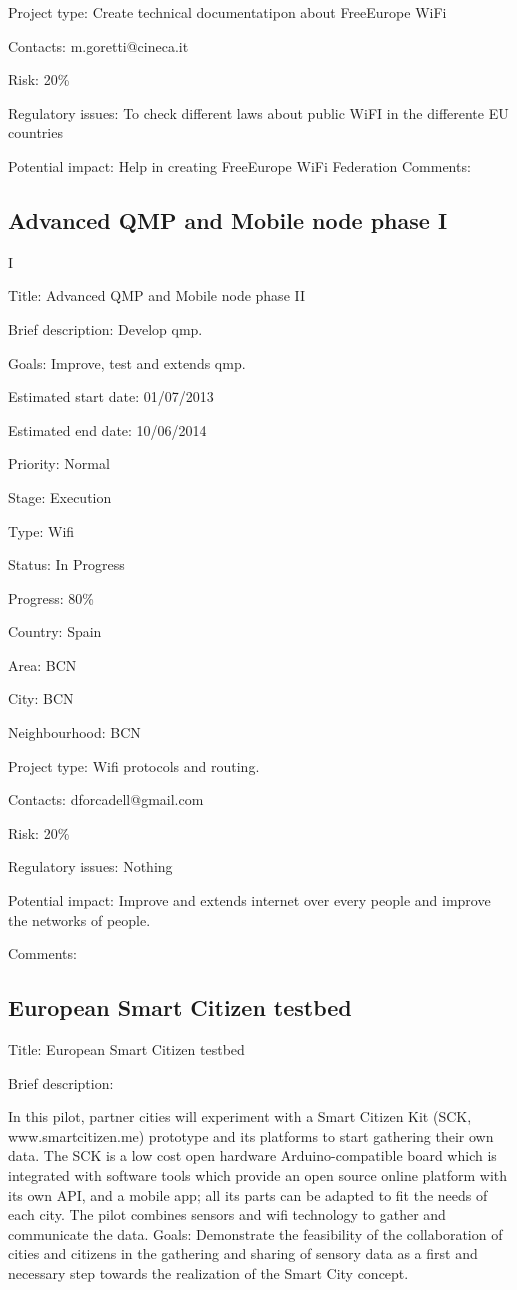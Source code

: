 \documentclass[draftclsnofoot,12pt,journal,onecolumn]{IEEEtran}
\begin{document}
Project type: Create technical documentatipon about FreeEurope WiFi 

Contacts: m.goretti@cineca.it

Risk: 20\% 

Regulatory issues: To check different laws about public WiFI in the 
differente EU countries 

Potential impact: Help in creating FreeEurope WiFi Federation 
Comments: 

\subsection{Advanced QMP and Mobile node phase I}I

Title: Advanced QMP and Mobile node phase II

Brief description: Develop qmp.

Goals: Improve, test and extends qmp.

Estimated start date: 01/07/2013

Estimated end date: 10/06/2014

Priority: Normal

Stage: Execution

Type: Wifi

Status: In Progress

Progress: 80\%

Country: Spain

Area: BCN

City: BCN

Neighbourhood: BCN

Project type: Wifi protocols and routing.

Contacts: dforcadell@gmail.com

Risk: 20\%

Regulatory issues: Nothing

Potential impact: Improve and extends internet over every people and improve
the networks of people.

Comments:

\subsection{European Smart Citizen testbed}

Title: European Smart Citizen testbed

Brief description:

In this pilot, partner cities will experiment with a Smart Citizen Kit (SCK,
www.smartcitizen.me) prototype and its platforms to start gathering their own
data. The SCK is a low cost open hardware Arduino-compatible board which is
integrated with software tools which provide an open source online platform
with its own API,
and a mobile app; all its parts can be adapted to fit the needs of each city.
The pilot combines sensors and wifi technology to gather and communicate the
data.
Goals: Demonstrate the feasibility of the collaboration of cities and
citizens in the gathering and sharing of sensory data as a first and
necessary step towards the realization of the Smart City concept.
\end{document}
